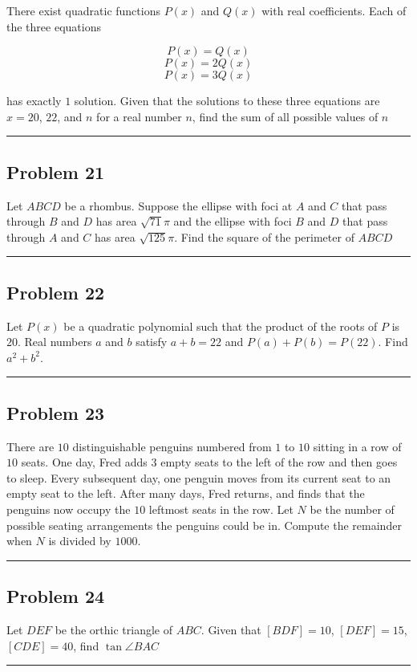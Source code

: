 \documentclass[10pt]{scrartcl}\usepackage[utf8]{inputenc}\usepackage{amsmath}\usepackage{amsfonts} \usepackage{tikz}\usepackage{asymptote}\usepackage[most]{tcolorbox}\usepackage{fancyhdr}\usepackage{geometry}\usepackage{color}\usepackage{lewis}\usepackage[T1]{fontenc}\usepackage[explicit]{titlesec}\usepackage{fontawesome}\usepackage{sansmathfonts}\pagestyle{fancy}
\begin{document}
There exist quadratic functions $P(x)$ and $Q(x)$ with real coefficients. Each of the three equations 

\[P(x) = Q(x)\] 
\[P(x) = 2Q(x)\] 
\[P(x) = 3Q(x)\]

has exactly $1$ solution. Given that the solutions to these three equations are $x = 20$, $22$, and $n$ for a real number $n$, find the sum of all possible values of $n$
\\
\noindent\rule{14.5cm}{0.8pt}
\subsection*{Problem 21}
Let $ABCD$ be a rhombus. Suppose the ellipse with foci at $A$ and $C$ that pass through $B$ and $D$ has area $\sqrt{71}\pi$ and the ellipse with foci $B$ and $D$ that pass through $A$ and $C$ has area $\sqrt{125}\pi$. Find the square of the perimeter of $ABCD$
\\
\noindent\rule{14.5cm}{0.8pt}
\subsection*{Problem 22}
Let \(P(x)\) be a quadratic polynomial such that the product of the roots of \(P\) is \(20\). Real numbers  \(a\) and \(b\) satisfy \(a+b = 22\) and \(P(a) + P(b) = P(22)\). Find \(a^2 + b^2\).
\\
\noindent\rule{14.5cm}{0.8pt}
\subsection*{Problem 23}
There are $10$ distinguishable penguins numbered from $1$ to $10$ sitting in a row of $10$ seats. One day, Fred adds $3$ empty seats to the left of the row and then goes to sleep. Every subsequent day, one penguin moves from its current seat to an empty seat to the left. After many days, Fred returns, and finds that the penguins now occupy the $10$ leftmost seats in the row. Let $N$ be the number of possible seating arrangements the penguins could be in. Compute the remainder when $N$ is divided by $1000$.
\\
\noindent\rule{14.5cm}{0.8pt}
\subsection*{Problem 24}

Let $DEF$ be the orthic triangle of $ABC$. Given that $[BDF]=10$, $[DEF]=15$, $[CDE]=40$, find $\tan{\angle{BAC}}$
\\
\noindent\rule{14.5cm}{0.8pt}
\end{document}

